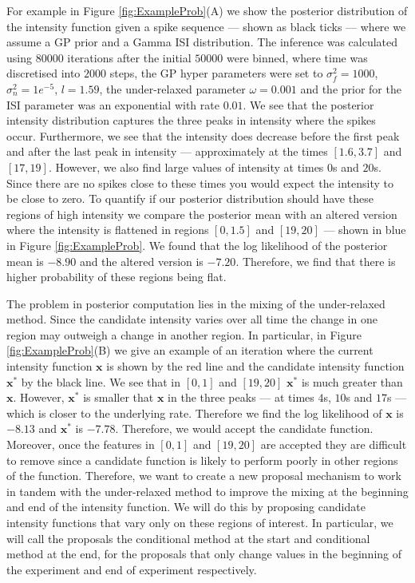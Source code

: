 \documentclass[oneside, 12 pt]{book}
\begin{document}
For example in Figure \ref{fig:ExampleProb}(A) we show the posterior distribution of the intensity function given a  spike sequence --- shown as black ticks --- where we assume a GP prior and a Gamma ISI distribution. The inference was calculated using $80000$ iterations after the initial $50000$ were binned, where time was discretised into $2000$ steps, the GP hyper parameters were   set to $\sigma_f^2 = 1000$, $\sigma_n^2 = 1e^{-5}$, $l=1.59$, the under-relaxed parameter $\omega = 0.001$ and the prior for the ISI parameter was an exponential with rate $0.01$. We see that the posterior intensity distribution captures the three peaks in intensity where the  spikes occur. Furthermore, we see that the intensity does decrease before the first peak and after the last peak in intensity --- approximately at the times $[1.6,3.7]$ and $[17,19]$. However, we also find large values of intensity at times $0$s and $20$s. Since there are no spikes close to these times you would expect the intensity to be close to zero. To quantify if our posterior distribution should have these regions of high intensity we compare the posterior mean with an altered version where the intensity is flattened in regions $[0,1.5]$ and $[19,20]$ --- shown in blue in Figure \ref{fig:ExampleProb}. We found that the log likelihood of the posterior mean is $-8.90$ and the altered version is $-7.20$. Therefore, we find that there is higher probability of these regions being flat. 
     
  
The problem in posterior computation lies in the mixing of the under-relaxed method. Since the candidate intensity varies over all time the change in one region may outweigh a change in another region. In particular,  in Figure \ref{fig:ExampleProb}(B) we give an example of an iteration where the current intensity function $\mathbf{x}$ is shown by the red line and the candidate intensity function $\mathbf{x^*}$ by the black line. We see that in $[0,1]$ and $[19,20]$ $\mathbf{x^*}$ is much greater than $\mathbf{x}$. However,  $\mathbf{x^*}$ is smaller that $\mathbf{x}$ in the three peaks --- at times $4$s, $10$s and $17$s --- which is closer to the underlying rate. Therefore we find the log likelihood of $\mathbf{x}$ is $-8.13$ and $\mathbf{x^*}$ is $-7.78$. Therefore, we would accept the candidate function. Moreover, once the features in $[0,1]$ and $[19,20]$ are accepted they are difficult to remove since a candidate function is likely to perform poorly in other regions of the function.
Therefore, we want to create a new proposal mechanism to work in tandem with the under-relaxed method to improve the mixing at the beginning and end of the intensity function. We will do this by proposing candidate intensity functions that vary only on these regions of interest. In particular, we will call the proposals the conditional method at the start and conditional method at the end, for the proposals that only change values in the beginning of the experiment and end of experiment respectively.
\end{document}
